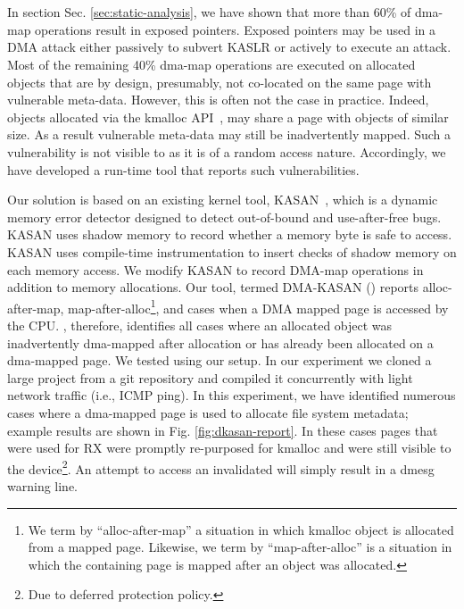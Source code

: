 \section{\dkasan}\label{sec:dma-kasan} 

In section Sec. \ref{sec:static-analysis}, we have shown that more than 60\% of dma-map operations result in exposed pointers. Exposed pointers may be used in a DMA attack either passively to subvert KASLR or actively to execute an attack. Most of the remaining 40\% dma-map operations are executed on allocated objects that are by design, presumably, not co-located on the same page with vulnerable meta-data. However, this is often not the case in practice.
Indeed, objects allocated via the kmalloc API~\cite{Cor07}, may share a page with objects of similar size. As a result vulnerable meta-data may still be inadvertently mapped. 
%
Such a vulnerability is not visible to \tool as it is of a random access nature. Accordingly, we have developed a run-time tool that reports such vulnerabilities. 

Our solution is based on an existing kernel tool, KASAN~\cite{kasan}, which is a dynamic memory error detector designed to detect out-of-bound and use-after-free bugs. KASAN uses shadow memory to record whether a memory byte is safe to access. KASAN uses compile-time instrumentation to insert checks of shadow memory on each memory access. 
We modify KASAN to record DMA-map operations in addition to memory allocations. Our tool, termed DMA-KASAN (\dkasan) reports alloc-after-map, map-after-alloc\footnote{We term by ``alloc-after-map'' a situation in which kmalloc object is allocated from a mapped page. Likewise, we term by ``map-after-alloc'' is a situation in which the containing page is mapped after an object was allocated.}, and cases when a DMA mapped page is accessed by the CPU. \dkasan, therefore, identifies all cases where an allocated object was inadvertently dma-mapped after allocation or has already been allocated on a dma-mapped page. We tested \dkasan using our setup. In our experiment we cloned a large project from a git repository and compiled it concurrently with light network traffic (i.e., ICMP ping). In this experiment, we have identified numerous cases where a dma-mapped page is used to allocate file system metadata; example results are shown in Fig. \ref{fig:dkasan-report}. In these cases pages that were used for RX were promptly re-purposed for kmalloc and were still visible to the device\footnote{Due to deferred protection policy.}. An attempt to access an invalidated \iova will simply result in a dmesg warning line.

